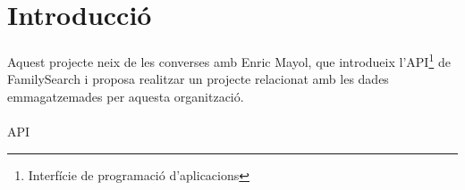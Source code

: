 \section{Introducció}
\paragraph{}
Aquest projecte neix de les converses amb Enric Mayol, que introdueix l'API\footnote{\label{foot-api}Interfície de programació d'aplicacions} de FamilySearch i proposa realitzar un projecte relacionat amb les dades emmagatzemades per aquesta organització.

\paragraph{}
\gls{API}
